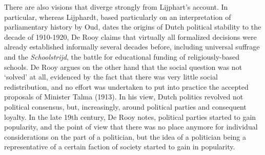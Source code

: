     There are also visions that diverge strongly from Lijphart's account. In particular, whereas Lijphardt, based particularly on an interpretation of parliamentary history by Oud, dates the origins of Dutch political stability to the decade of 1910-1920, De Rooy claims that virtually all formalized decisions were already established informally several decades before, including universal suffrage and the \textit{Schoolstrijd}, the battle for educational funding of religiously-based schools.\autocite{oud1961honderd} \autocite{rooy2014ons} De Rooy argues on the other hand that the social question was not ‘solved’ at all, evidenced by the fact that there was very little social redistribution, and no effort was undertaken to put into practice the accepted proposals of Minister Talma (1913). In his view, Dutch politics revolved not political consensus, but, increasingly, around political parties and consequent loyalty. In the late 19th century, De Rooy notes, political parties started to gain popularity, and the point of view that there was no place anymore for individual considerations on the part of a politician, but the idea of a politician being a representative of a certain faction of society started to gain in popularity. 
    
